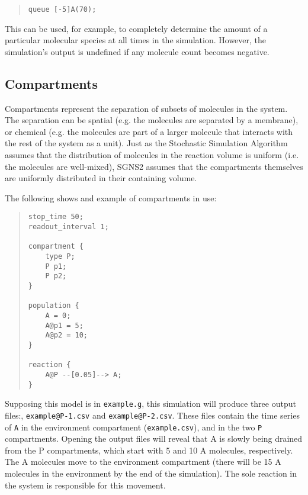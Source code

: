 \documentclass[10pt]{article}
\newcommand{\code}[1]{{\tt {#1}}}
\newcommand{\programname}{SGNS2}
\begin{document}
\begin{quote}
\begin{verbatim}
queue [-5]A(70);
\end{verbatim}
\end{quote}

This can be used, for example, to completely determine the amount of a particular molecular species at all times in the simulation. However, the simulation's output is undefined if any molecule count becomes negative.

\subsection{Compartments}
\label{sec:ex-compartments}

Compartments represent the separation of subsets of molecules in the system. The separation can be spatial (e.g. the molecules are separated by a membrane), or chemical (e.g. the molecules are part of a larger molecule that interacts with the rest of the system as a unit). Just as the Stochastic Simulation Algorithm assumes that the distribution of molecules in the reaction volume is uniform (i.e. the molecules are well-mixed), {\programname} assumes that the compartments themselves are uniformly distributed in their containing volume.

The following shows and example of compartments in use: 

\begin{quote}
\begin{verbatim}
stop_time 50;
readout_interval 1;

compartment {
    type P;
    P p1;
    P p2;
}

population {
    A = 0;
    A@p1 = 5;
    A@p2 = 10;
}

reaction {
    A@P --[0.05]--> A;
}
\end{verbatim}
\end{quote}

Supposing this model is in \code{example.g}, this simulation will produce three output files:\linebreak[4]\code{example.csv}, \code{example@P-1.csv} and \code{example@P-2.csv}. These files contain the time series of \code{A} in the environment compartment (\code{example.csv}), and in the two \code{P} compartments. Opening the output files will reveal that A is slowly being drained from the P compartments, which start with 5 and 10 A molecules, respectively. The A molecules move to the environment compartment (there will be 15 A molecules in the environment by the end of the simulation). The sole reaction in the system is responsible for this movement.
\end{document}
